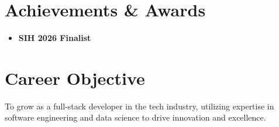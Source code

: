 \documentclass[a4paper,10pt]{article}
\newcommand{\resumeSubHeadingListStart}{\begin{itemize}[leftmargin=0.15in, label={}]}
\newcommand{\resumeSubHeadingListEnd}{\end{itemize}}
\begin{document}
\section{Achievements \& Awards}
\resumeSubHeadingListStart
    \item \small{\textbf{SIH 2026 Finalist}}
  \resumeSubHeadingListEnd
\vspace{4pt}

\section{Career Objective}
\small{To grow as a full-stack developer in the tech industry, utilizing expertise in software engineering and data science to drive innovation and excellence.}
\vspace{6pt}
\end{document}
